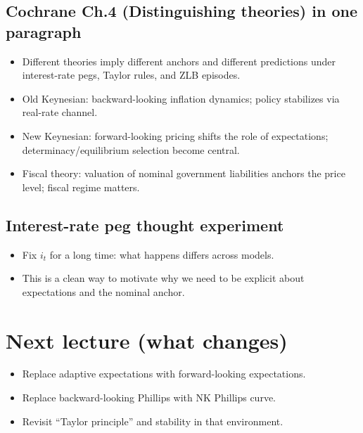 \documentclass[11pt]{article}
\begin{document}
\subsection*{Cochrane Ch.4 (Distinguishing theories) in one paragraph}
\begin{itemize}
\item Different theories imply different anchors and different predictions under interest-rate pegs, Taylor rules, and ZLB episodes.
\item Old Keynesian: backward-looking inflation dynamics; policy stabilizes via real-rate channel.
\item New Keynesian: forward-looking pricing shifts the role of expectations; determinacy/equilibrium selection become central.
\item Fiscal theory: valuation of nominal government liabilities anchors the price level; fiscal regime matters.
\end{itemize}

\subsection*{Interest-rate peg thought experiment}
\begin{itemize}
\item Fix $i_t$ for a long time: what happens differs across models.
\item This is a clean way to motivate why we need to be explicit about expectations and the nominal anchor.
\end{itemize}

\section*{Next lecture (what changes)}
\begin{itemize}
\item Replace adaptive expectations with forward-looking expectations.
\item Replace backward-looking Phillips with NK Phillips curve.
\item Revisit ``Taylor principle'' and stability in that environment.
\end{itemize}
\end{document}
